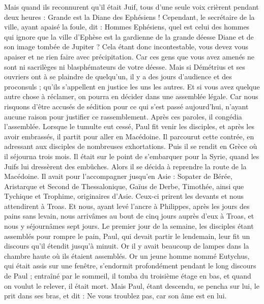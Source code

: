 \begin{multicols}{2}
Mais quand ils reconnurent qu'il était Juif, tous d’une seule voix crièrent pendant deux heures : Grande est la Diane des Ephésiens !
Cependant, le secrétaire de la ville, ayant apaisé la foule, dit : Hommes Ephésiens, quel est celui des hommes qui ignore que la ville d’Ephèse est la gardienne de la grande déesse Diane et de son image tombée de Jupiter ?
Cela étant donc incontestable, vous devez vous apaiser et ne rien faire avec précipitation.
Car ces gens que vous avez amenés ne sont ni sacrilèges ni blasphémateurs de votre déesse.
Mais si Démétrius et ses ouvriers ont à se plaindre de quelqu’un, il y a des jours d’audience et des proconsuls ; qu’ils s’appellent en justice les uns les autres.
Et si vous avez quelque autre chose à réclamer, on pourra en décider dans une assemblée légale.
Car nous risquons d’être accusés de sédition pour ce qui s'est passé aujourd'hui, n’ayant aucune raison pour justifier ce rassemblement. Après ces paroles, il congédia l’assemblée.
\VerseOne{}Lorsque le tumulte eut cessé, Paul fit venir les disciples, et après les avoir embrassés, il partit pour aller en Macédoine.
Il parcourut cette contrée, en adressant aux disciples de nombreuses exhortations.
Puis il se rendit en Grèce où il séjourna trois mois. Il était sur le point de s’embarquer pour la Syrie, quand les Juifs lui dressèrent des embûches. Alors il se décida à reprendre la route de la Macédoine.
Il avait pour l’accompagner jusqu’en Asie : Sopater de Bérée, Aristarque et Second de Thessalonique, Gaïus de Derbe, Timothée, ainsi que Tychique et Trophime, originaires d’Asie.
Ceux-ci prirent les devants et nous attendirent à Troas.
Et nous, ayant levé l'ancre à Philippes, après les jours des pains sans levain, nous arrivâmes au bout de cinq jours auprès d'eux à Troas, et nous y séjournâmes sept jours.
Le premier jour de la semaine, les disciples étant assemblés pour rompre le pain, Paul, qui devait partir le lendemain, leur fit un discours qu'il étendit jusqu'à minuit.
Or il y avait beaucoup de lampes dans la chambre haute où ils étaient assemblés.
Or un jeune homme nommé Eutychus, qui était assis sur une fenêtre, s’endormit profondément pendant le long discours de Paul ; entraîné par le sommeil, il tomba du troisième étage en bas, et quand on voulut le relever, il était mort.
Mais Paul, étant descendu, se pencha sur lui, le prit dans ses bras, et dit : Ne vous troublez pas, car son âme est en lui.

\end{multicols}
